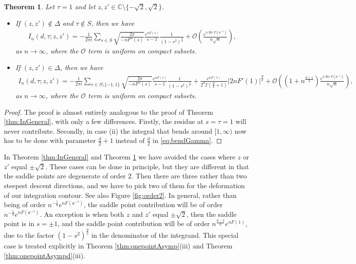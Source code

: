 \documentclass[%
 jmp,
cp,  %
 amsmath,amsthm,amssymb,%
 reprint,%
onecolumn]{revtex4-2}
\newtheorem{theorem}{Theorem}[section]
\begin{document}
\begin{theorem} \label{thm:InGeneralTau1}
Let $\tau=1$ and let $z,z'\in \mathbb C\setminus \{-\sqrt 2, \sqrt 2\}$.
\begin{itemize}
\item[(i)] If $(z,z')\not\in \Delta$ and $\tau\not\in S$, then we have 
\begin{align} \label{eq:generalSteepestDresult1Tau1}
I_n(d, \tau;z,z')
= - \frac{1}{2\pi i} \sum_{s\in S} \sqrt{\frac{2\pi}{-n F''(s)}} \frac{e^{n F(s)}}{s-1} \frac{1}{(1-s^2)^\frac{d}{2}} 
+ \mathcal O\left(\frac{e^{n \operatorname{Re} F(a^{-1})}}{n\sqrt n}\right),
\end{align}
as $n\to\infty$, where the $\mathcal O$ term is uniform on compact subsets.
\item[(ii)] If $(z,z')\in \Delta$, then we have 
\begin{align} \label{eq:generalSteepestDresult2Tau1}
I_n(d, \tau;z,z')
= - \frac{1}{2\pi i} \sum_{s\in S\setminus\{-1,1\}} \sqrt{\frac{2\pi}{-n F''(s)}} \frac{e^{n F(s)}}{s-1} \frac{1}{(1-s^2)^\frac{d}{2}} 
+  \frac{e^{n F(1)}}{2^{d} \Gamma\left(\frac{d}{2}+1\right)} |2 nF'(1)|^{\frac{d}{2}} 
+  \mathcal O\left((1+n^{\frac{d+1}{2}}) \frac{e^{n \operatorname{Re} F(a^{-1})}}{n\sqrt n}\right),
\end{align}
as $n\to\infty$, where the $\mathcal O$ term is uniform on compact subsets. 
\end{itemize}
\end{theorem}

\begin{proof}
The proof is almost entirely analogous to the proof of Theorem \ref{thm:InGeneral}, with only a few differences. Firstly, the residue at $s=\tau=1$ will never contribute. Secondly, in case (ii) the integral that bends around $[1,\infty)$ now has to be done with parameter $\frac{d}{2}+1$ instead of $\frac{d}{2}$ in \eqref{eq:bendGamma}. 
\end{proof}


In Theorem \ref{thm:InGeneral} and Theorem \ref{thm:InGeneralTau1} we have avoided the cases where $z$ or $z'$ equal $\pm \sqrt 2$. These cases can be done in principle, but they are different in that the saddle points are degenerate of order $2$. Then there are three rather than two steepest descent directions, and we have to pick two of them for the deformation of our integration contour. See also Figure \ref{fig:order2}. In general, rather than being of order $n^{-\frac{1}{2}} e^{n F(a^{-1})}$, the saddle point contribution will be of order $n^{-\frac{1}{3}} e^{n F(a^{-1})}$. An exception is when both $z$ and $z'$ equal $\pm \sqrt 2$, then the saddle point is in $s=\pm 1$, and the saddle point contribution will be of order $n^{\frac{d-2}{6}} e^{n F(1)}$, due to the factor $(1-s^2)^\frac{d}{2}$ in the denominator of the integrand. This special case is treated explicitly in Theorem \ref{thm:onepointAsymp}(iii) and Theorem \ref{thm:onepointAsympd}(iii).
\end{document}
